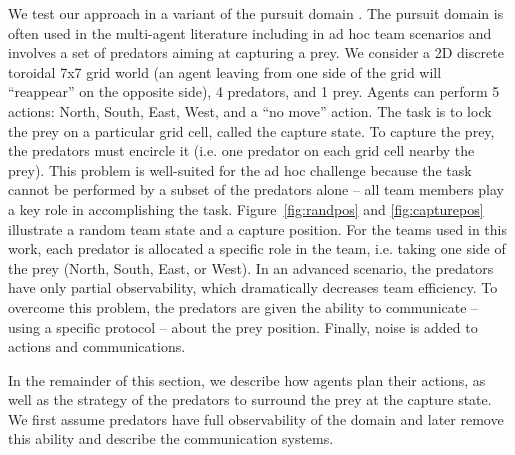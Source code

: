 We test our approach in a variant of the pursuit domain \cite{benda1986empirical}. The pursuit domain is often used in the multi-agent literature \cite{stone2000multiagent} including in ad hoc team scenarios \cite{barrett2011empirical} and involves a set of predators aiming at capturing a prey. We consider a 2D discrete toroidal 7x7 grid world (an agent leaving from one side of the grid will ``reappear'' on the opposite side), 4 predators, and 1 prey. Agents can perform 5 actions: North, South, East, West, and a ``no move'' action. The task is to lock the prey on a particular grid cell, called the capture state. To capture the prey, the predators must encircle it (i.e. one predator on each grid cell nearby the prey). This problem is well-suited for the ad hoc challenge because the task cannot be performed by a subset of the predators alone -- all team members play a key role in accomplishing the task. Figure~\ref{fig:randpos} and \ref{fig:capturepos} illustrate a random team state and a capture position. For the teams used in this work, each predator is allocated a specific role in the team, i.e. taking one side of the prey (North, South, East, or West). In an advanced scenario, the predators have only partial observability, which dramatically decreases team efficiency. To overcome this problem, the predators are given the ability to communicate -- using a specific protocol -- about the prey position. Finally, noise is added to actions and communications.



In the remainder of this section, we describe how agents plan their actions, as well as the strategy of the predators to surround the prey at the capture state. We first assume predators have full observability of the domain and later remove this ability and describe the communication systems.


